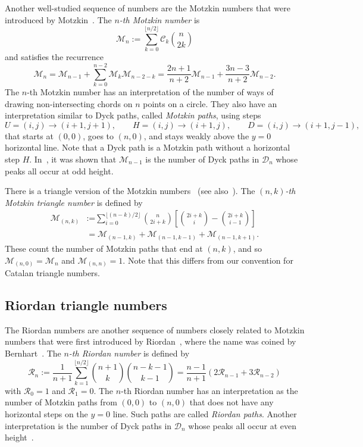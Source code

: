 \documentclass[11pt, leqno]{amsart}
\theoremstyle{plain}
\theoremstyle{definition}
\numberwithin{equation}{section}
\newcommand{\seteq}{\mathbin{:=}}
\newcommand{\Cat}{\mathcal{C}} %
\newcommand{\Mot}{\mathcal{M}} %
\newcommand{\Rior}{\mathcal{R}} %
\newcommand{\Dyck}{\mathcal{D}} %
\newcommand{\defn}[1]{{\color{darkred}\emph{#1}}} %
\begin{document}
Another well-studied sequence of numbers are the Motzkin numbers that were introduced by Motzkin~\cite{Motzkin48}.
The \defn{$n$-th Motzkin number} is
\[
\Mot_n \seteq \sum_{k=0}^{\lfloor n/2 \rfloor} \Cat_k \binom{n}{2k}
\]
and satisfies the recurrence
\[
\Mot_n = \Mot_{n-1} + \sum_{k=0}^{n-2} \Mot_k \Mot_{n-2-k} = \frac{2n+1}{n+2} \Mot_{n-1} + \frac{3n-3}{n+2} \Mot_{n-2}.
\]
The $n$-th Motzkin number has an interpretation of the number of ways of drawing non-intersecting chords on $n$ points on a circle. They also have an interpretation similar to Dyck paths, called \defn{Motzkin paths}, using steps
\[
U = (i,j) \to (i+1,j+1),
\qquad
H = (i, j) \to (i+1, j),
\qquad
D = (i, j) \to (i+1, j-1),
\]
that starts at $(0, 0)$, goes to $(n, 0)$, and stays weakly above the $y = 0$ horizontal line. Note that a Dyck path is a Motzkin path without a horizontal step $H$.
In~\cite{Callen17}, it was shown that $\Mot_{n-1}$ is the number of Dyck paths in $\Dyck_n$ whose peaks all occur at odd height.

There is a triangle version of the Motzkin numbers~\cite{Lando03} (see also~\cite[A026300]{OEIS}). 
The \defn{$(n,k)$-th Motzkin triangle number} is defined by
\begin{align*}
\Mot_{(n,k)} & \seteq \sum_{i=0}^{\lfloor (n-k)/2 \rfloor} \binom{n}{2i+k} \left[ \binom{2i+k}{i} - \binom{2i+k}{i-1} \right]
\\ & = \Mot_{(n-1,k)} + \Mot_{(n-1,k-1)} + \Mot_{(n-1,k+1)}.
\end{align*}
These count the number of Motzkin paths that end at $(n,k)$, and so $\Mot_{(n,0)} = \Mot_n$ and $\Mot_{(n,n)} = 1$. Note that this differs from our convention for Catalan triangle numbers.


\subsection{Riordan triangle numbers}

The Riordan numbers are another sequence of numbers closely related to Motzkin numbers that were first introduced by Riordan~\cite{Riordan75}, where the name was coined by Bernhart~\cite{Bernhart97}. The \defn{$n$-th Riordan number} is defined by
\[
\Rior_n \seteq \frac{1}{n+1} \sum_{k=1}^{\lfloor n/2 \rfloor} \binom{n+1}{k} \binom{n-k-1}{k-1} = \frac{n-1}{n+1} \left(2 \Rior_{n-1} + 3 \Rior_{n-2} \right)
\]
with $\Rior_0 = 1$ and $\Rior_1 = 0$. The $n$-th Riordan number has an interpretation as the number of Motzkin paths from $(0,0)$ to $(n,0)$ that does not have any horizontal steps on the $y=0$ line. Such paths are called \defn{Riordan paths}. Another interpretation is the number of Dyck paths in $\Dyck_n$ whose peaks all occur at even height~\cite{Callen17}.
\end{document}
